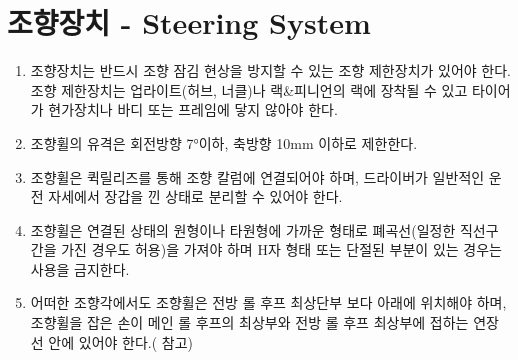 \documentclass[final,a4paper,10pt]{report}
\begin{document}
\section{조향장치 - Steering System}\label{rule:formula-technical.steering}
\begin{enumerate}
  \item\label{rule:formula-technical.steering.steering-lock-stop} 조향장치는 반드시 조향 잠김 현상을 방지할 수 있는 조향 제한장치가 있어야 한다. 조향 제한장치는 업라이트(허브, 너클)나 랙\&피니언의 랙에 장착될 수 있고 타이어가 현가장치나 바디 또는 프레임에 닿지 않아야 한다.
  \item\label{rule:formula-technical.steering.steering-play-limits} 조향휠의 유격은 회전방향 7°이하, 축방향 10mm 이하로 제한한다.
  \item\label{rule:formula-technical.steering.quick-release-with-gloves} 조향휠은 퀵릴리즈를 통해 조향 칼럼에 연결되어야 하며, 드라이버가 일반적인 운전 자세에서 장갑을 낀 상태로 분리할 수 있어야 한다.
  \item\label{rule:formula-technical.steering.closed-loop-wheel-shape} 조향휠은 연결된 상태의 원형이나 타원형에 가까운 형태로 폐곡선(일정한 직선구간을 가진 경우도 허용)을 가져야 하며 H자 형태 또는 단절된 부분이 있는 경우는 사용을 금지한다.
  \item\label{rule:formula-technical.steering.wheel-below-hoop-line} 어떠한 조향각에서도 조향휠은 전방 롤 후프 최상단부 보다 아래에 위치해야 하며, 조향휠을 잡은 손이 메인 롤 후프의 최상부와 전방 롤 후프 최상부에 접하는 연장선 안에 있어야 한다.( 참고)
\end{enumerate}
\end{document}
